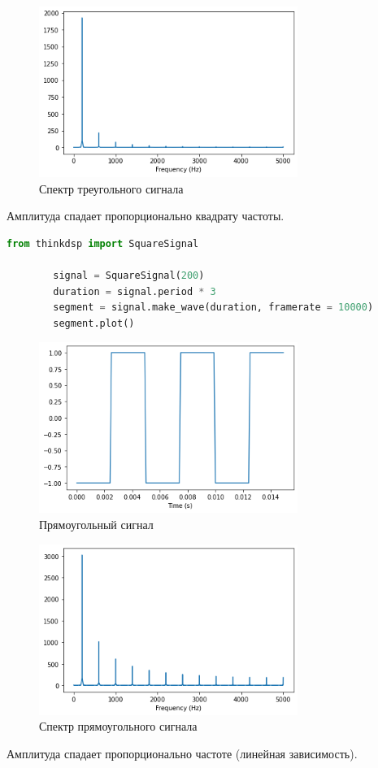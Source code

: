 \documentclass[a4paper, 12pt]{report}
\begin{document}
	\begin{figure}[H]
		\centering
		\includegraphics[width=0.75\textwidth]{tri_spectrum.png}
		\caption{Спектр треугольного сигнала}
		\label{fig:tri_spectrum}
	\end{figure}
	Амплитуда спадает пропорционально квадрату частоты.

	\begin{lstlisting}[language=Python,caption=Построение прямоугольного сигнала]
		from thinkdsp import SquareSignal

		signal = SquareSignal(200)
		duration = signal.period * 3
		segment = signal.make_wave(duration, framerate = 10000)
		segment.plot()
	\end{lstlisting}
	\begin{figure}[H]
		\centering
		\includegraphics[width=0.75\textwidth]{sq_segment.png}
		\caption{Прямоугольный сигнал}
		\label{fig:sq_segment}
	\end{figure}
	\begin{figure}[H]
		\centering
		\includegraphics[width=0.75\textwidth]{sq_spectrum.png}
		\caption{Спектр прямоугольного сигнала}
		\label{fig:sq_spectrum}
	\end{figure}
	Амплитуда спадает пропорционально частоте (линейная зависимость).
\end{document}
